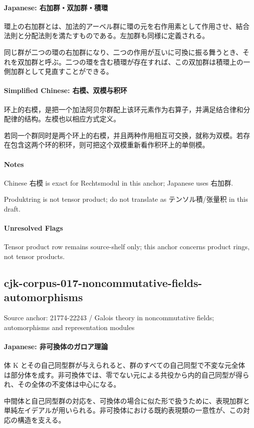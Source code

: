 \documentclass[11pt]{article}
\begin{document}
\paragraph{Japanese: 右加群・双加群・積環}
環上の右加群とは、加法的アーベル群に環の元を右作用素として作用させ、結合法則と分配法則を満たすものである。左加群も同様に定義される。\par
同じ群が二つの環の右加群になり、二つの作用が互いに可換に振る舞うとき、それを双加群と呼ぶ。二つの環を含む積環が存在すれば、この双加群は積環上の一側加群として見直すことができる。\par
\paragraph{Simplified Chinese: 右模、双模与积环}
环上的右模，是把一个加法阿贝尔群配上该环元素作为右算子，并满足结合律和分配律的结构。左模也以相应方式定义。\par
若同一个群同时是两个环上的右模，并且两种作用相互可交换，就称为双模。若存在包含这两个环的积环，则可把这个双模重新看作积环上的单侧模。\par
\paragraph{Notes}
Chinese 右模 is exact for Rechtsmodul in this anchor; Japanese uses 右加群.\par
Produktring is not tensor product; do not translate as テンソル積/张量积 in this draft.\par
\paragraph{Unresolved Flags}
Tensor product row remains source-shelf only; this anchor concerns product rings, not tensor products.\par
\subsection*{cjk-corpus-017-noncommutative-fields-automorphisms}
Source anchor: 21774-22243 / Galois theory in noncommutative fields; automorphisms and representation modules
\par
\paragraph{Japanese: 非可換体のガロア理論}
体 K とその自己同型群が与えられると、群のすべての自己同型で不変な元全体は部分体を成す。非可換体では、零でない元による共役から内的自己同型が得られ、その全体の不変体は中心になる。\par
中間体と自己同型群の対応を、可換体の場合に似た形で扱うために、表現加群と単純左イデアルが用いられる。非可換体における既約表現類の一意性が、この対応の構造を支える。\par
\end{document}
